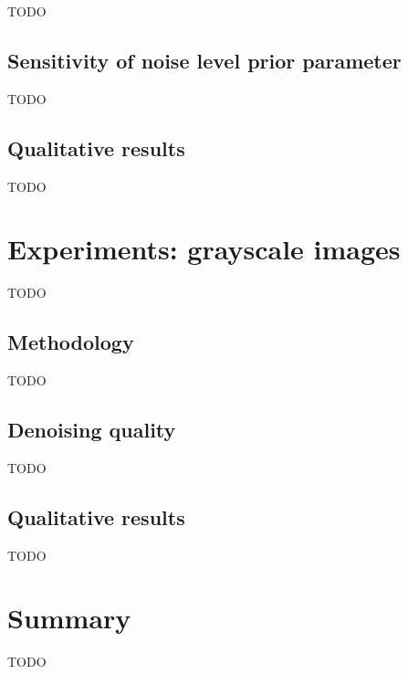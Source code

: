 \documentclass[a4paper, 11pt, onecolumn, openany, titlepage]{report}
\newcommand\numberedchapter[1]{\setlength\topskip{3cm}\chapter{#1}\setlength\topskip{0cm}}
\theoremstyle{default_theorem_style}\newtheorem{theorem}{Theorem}
\theoremstyle{default_theorem_style}\newtheorem{definition}{Definition}
\begin{document}
TODO

\section{Sensitivity of noise level prior parameter}

TODO

\section{Qualitative results}

TODO

\numberedchapter{Experiments: grayscale images}

TODO

\section{Methodology}

TODO

\section{Denoising quality}

TODO

\section{Qualitative results}

TODO

\numberedchapter{Summary}

TODO
\end{document}
